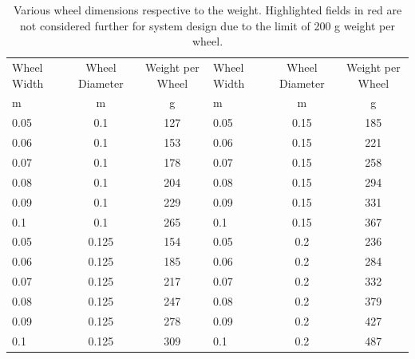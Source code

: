 \begin{table}[htb]
\centering
\caption{Various wheel dimensions respective to the weight. Highlighted fields in red are not considered further for system design due to the limit of 200 g weight per wheel.}
\begin{adjustbox}{max width=\textwidth}
\begin{tabular}[l]{lcc|lcc}

	\toprule
		\multicolumn{1}{l}{Wheel Width} & \multicolumn{1}{c}{Wheel Diameter} & \multicolumn{1}{c|}{Weight per Wheel}	& \multicolumn{1}{l}{Wheel Width}	 & \multicolumn{1}{c}{Wheel Diameter} 		& \multicolumn{1}{c}{Weight per Wheel}    \\

\multicolumn{1}{l}{\:\:\:\:\:\: m}		& \multicolumn{1}{c}{m} 			& \multicolumn{1}{c|}{g} 					& \multicolumn{1}{l}{\:\:\:\:\:\: m}& \multicolumn{1}{c}{m}					& \multicolumn{1}{c}{g} \\
	\midrule
	
	0.05	&	0.1		&	127		& 0.05		&	0.15	&	185									\\ 
	0.06	&	0.1		&	153		&	0.06	&	0.15	&	\cellcolor[HTML]{CB0000}221		\\	
	0.07	&	0.1		&	178		&	0.07	&	0.15	&	\cellcolor[HTML]{CB0000}258		\\
	0.08	&	0.1		&	\cellcolor[HTML]{CB0000}204	&	0.08	&	0.15	&	\cellcolor[HTML]{CB0000}294		\\	
	0.09	&	0.1		&	\cellcolor[HTML]{CB0000}229	&	0.09	&	0.15	&	\cellcolor[HTML]{CB0000}331		\\
	0.1		&	0.1		&	\cellcolor[HTML]{CB0000}265	&	0.1		&	0.15	&	\cellcolor[HTML]{CB0000}367		\\	
	0.05	&	0.125	&	154		&	0.05	&	0.2		&	\cellcolor[HTML]{CB0000}236		\\
	0.06	&	0.125	&	185		&	0.06	&	0.2		&	\cellcolor[HTML]{CB0000}284		\\
	0.07	&	0.125	&	\cellcolor[HTML]{CB0000}217		&	0.07	&	0.2		&	\cellcolor[HTML]{CB0000}332		\\	
	0.08	&	0.125	&	\cellcolor[HTML]{CB0000}247		&	0.08	&	0.2		&	\cellcolor[HTML]{CB0000}379		\\
	0.09	&	0.125	&	\cellcolor[HTML]{CB0000}278		&	0.09	&	0.2		&	\cellcolor[HTML]{CB0000}427		\\
	0.1		&	0.125	&	\cellcolor[HTML]{CB0000}309		&	0.1		&	0.2		&	\cellcolor[HTML]{CB0000}487		\\
	
	\bottomrule

\end{tabular}
\end{adjustbox}
\label{tab:Geometry}
\end{table}


